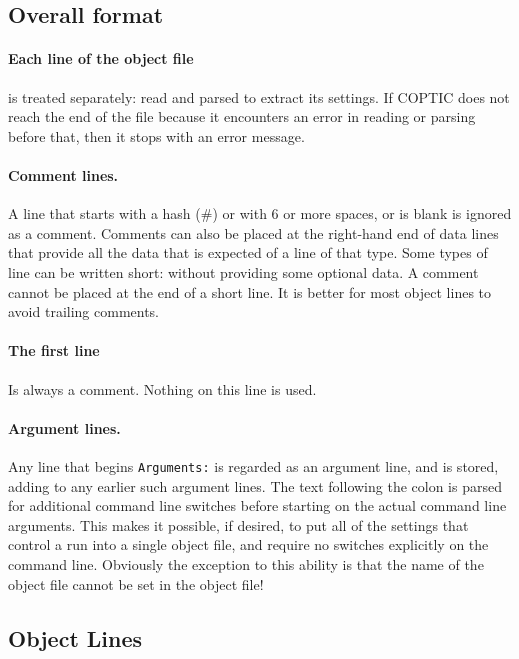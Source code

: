 \documentclass[12pt]{article}
\begin{document}
\subsection{Overall format}

\paragraph{Each line of the object file} is treated separately: read and parsed to
extract its settings. If COPTIC does not reach the end of the file
because it encounters an error in reading or parsing before that, then
it stops with an error message.

\paragraph{Comment lines.} A line that starts with a hash (\#) 
or with 6 or more spaces, or is blank is ignored as a
comment. Comments can also be placed at the right-hand end of data
lines that provide all the data that is expected of a line of that
type. Some types of line can be written short: without providing some
optional data. A comment cannot be placed at the end of a short line.
It is better for most object lines to avoid trailing comments.

\paragraph{The first line} Is always a comment. Nothing on this line is used.

\paragraph{Argument lines.} Any line that begins \verb!Arguments:! is
regarded as an argument line, and is stored, adding to any earlier
such argument lines. The text following the colon is parsed for
additional command line switches before starting on the actual command
line arguments. This makes it possible, if desired, to put all of the
settings that control a run into a single object file, and require no
switches explicitly on the command line. Obviously the exception to
this ability is that the name of the object file cannot be set in the
object file!

\subsection{Object Lines}
\end{document}
